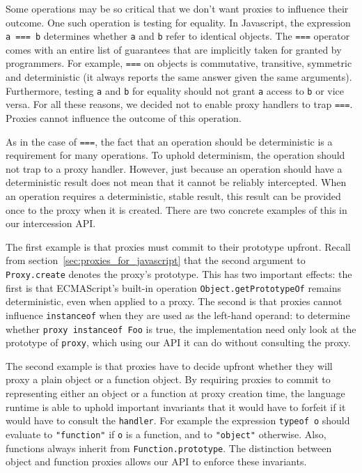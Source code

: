 \documentclass{sig-alternate}
\begin{document}
Some operations may be so critical that we don't want proxies to influence their outcome. One such operation is testing for equality. In Javascript, the expression \texttt{a === b} determines whether \texttt{a} and \texttt{b} refer to identical objects. The \texttt{===} operator comes with an entire list of guarantees that are implicitly taken for granted by programmers. For example, \texttt{===} on objects is commutative, transitive, symmetric and deterministic (it always reports the same answer given the same arguments). Furthermore, testing \texttt{a} and \texttt{b} for equality should not grant \texttt{a} access to \texttt{b} or vice versa. For all these reasons, we decided not to enable proxy handlers to trap \texttt{===}. Proxies cannot influence the outcome of this operation.

As in the case of \texttt{===}, the fact that an operation should be deterministic is a requirement for many operations. To uphold determinism, the operation should not trap to a proxy handler. However, just because an operation should have a deterministic result does not mean that it cannot be reliably intercepted. When an operation requires a deterministic, stable result, this result can be provided once to the proxy when it is created. There are two concrete examples of this in our intercession API.

The first example is that proxies must commit to their prototype upfront. Recall from section~\ref{sec:proxies_for_javascript} that the second argument to \texttt{Proxy.create} denotes the proxy's prototype. This has two important effects: the first is that ECMAScript's built-in operation \texttt{Object.getPrototypeOf} remains deterministic, even when applied to a proxy. The second is that proxies cannot influence \texttt{instanceof} when they are used as the left-hand operand: to determine whether \texttt{proxy instanceof Foo} is true, the implementation need only look at the prototype of \texttt{proxy}, which using our API it can do without consulting the proxy.

The second example is that proxies have to decide upfront whether they will proxy a plain object or a function object. By requiring proxies to commit to representing either an object or a function at proxy creation time, the language runtime is able to uphold important invariants that it would have to forfeit if it would have to consult the \texttt{handler}. For example the expression \texttt{typeof o} should evaluate to \texttt{"function"} if \texttt{o} is a function, and to \texttt{"object"} otherwise. Also, functions always inherit from \texttt{Function.prototype}. The distinction between object and function proxies allows our API to enforce these invariants.
\end{document}
